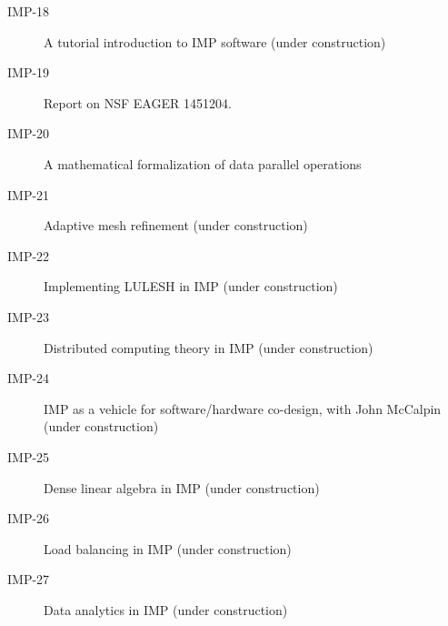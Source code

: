 \begin{description}
  \item[IMP-18] A tutorial introduction to IMP software (under construction)
  \item[IMP-19] Report on NSF EAGER 1451204.
  \item[IMP-20] A mathematical formalization of data parallel operations
  \item[IMP-21] Adaptive mesh refinement (under construction)
  \item[IMP-22] Implementing LULESH in IMP (under construction)
  \item[IMP-23] Distributed computing theory in IMP (under construction)
  \item[IMP-24] IMP as a vehicle for software/hardware co-design, with
    John McCalpin (under construction)
  \item[IMP-25] Dense linear algebra in IMP (under construction)
  \item[IMP-26] Load balancing in IMP (under construction)
  \item[IMP-27] Data analytics in IMP (under construction)
\end{description}
\endgroup
